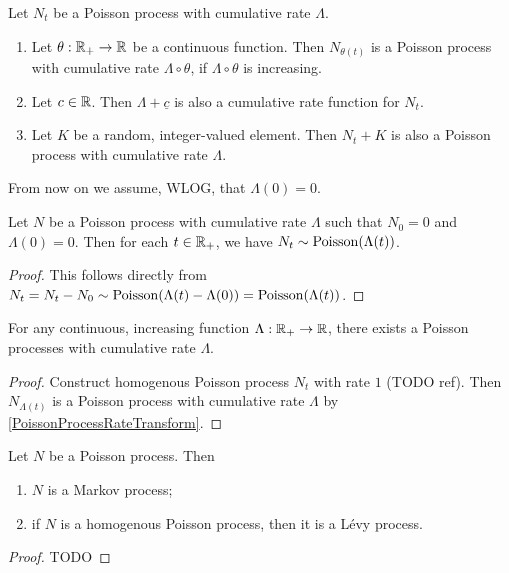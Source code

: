\begin{lemma} \label{PoissonProcessRateTransform}
Let $N_t$ be a Poisson process with cumulative rate $\Lambda$.
\begin{enumerate}
\item Let $\theta: \mathbb{R}_+\to \mathbb{R}$ be a continuous function. Then $N_{\theta(t)}$ is a Poisson process with cumulative rate $\Lambda\circ \theta$, if $\Lambda\circ \theta$ is increasing.
\item Let $c\in \mathbb{R}$. Then $\Lambda + \underline{c}$ is also a cumulative rate function for $N_t$.
\item Let $K$ be a random, integer-valued element. Then $N_t + K$ is also a Poisson process with cumulative rate $\Lambda$.
\end{enumerate}
\end{lemma}
From now on we assume, WLOG, that $\Lambda(0) = 0$.

\begin{lemma}
Let $N$ be a Poisson process with cumulative rate $\Lambda$ such that $N_0 = 0$ and $\Lambda(0) = 0$. Then for each $t\in \mathbb{R}_+$, we have $N_t \sim \operatorname{Poisson}(\Lambda(t))$.
\end{lemma}
\begin{proof}
This follows directly from $N_t = N_t - N_0 \sim \operatorname{Poisson}(\Lambda(t) - \Lambda(0)) = \operatorname{Poisson}(\Lambda(t))$.
\end{proof}

\begin{proposition}
For any continuous, increasing function $\Lambda: \mathbb{R}_+\to \mathbb{R}$, there exists a Poisson processes with cumulative rate $\Lambda$.
\end{proposition}
\begin{proof}
Construct homogenous Poisson process $N_t$ with rate $1$ (TODO ref). Then $N_{\Lambda(t)}$ is a Poisson process with cumulative rate $\Lambda$ by \ref{PoissonProcessRateTransform}.
\end{proof}

\begin{proposition}
Let $N$ be a Poisson process. Then
\begin{enumerate}
\item $N$ is a Markov process;
\item if $N$ is a homogenous Poisson process, then it is a Lévy process.
\end{enumerate}
\end{proposition}
\begin{proof}
TODO
\end{proof}

